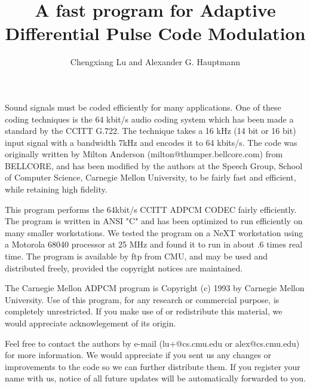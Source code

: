 \setlength{\parskip}{2ex}\setlength{\parindent}{0pt}
\renewcommand{\topfraction}{0.95}
\renewcommand{\textfraction}{0.05}
\setcounter{topnumber}{2}\setcounter{bottomnumber}{2}

\title{A fast program for Adaptive Differential Pulse Code Modulation}
\author{Chengxiang Lu and Alexander G. Hauptmann}


\maketitle


Sound signals must be coded efficiently for many applications. 
One of these coding techniques is the 64 kbit/s audio coding system
which has been made a standard by the CCITT G.722.
The technique takes a 16 kHz (14 bit or 16 bit) input signal with a bandwidth
7kHz and encodes it to 64 kbits/s. 
The code was originally written by Milton Anderson (milton@thumper.bellcore.com)
 from BELLCORE, and has
been modified by the authors at the Speech Group, School of Computer Science, 
Carnegie Mellon University, to be fairly fast and efficient, 
while retaining high fidelity.

This program performs the 64kbit/s CCITT ADPCM CODEC fairly efficiently.
The program is written in ANSI "C" and has been optimized to run efficiently 
on many smaller workstations. We tested the program on a NeXT
workstation using a Motorola 68040 processor at 25 MHz and found it
to run in about .6 times real time.
The program is available by ftp from CMU, and may be used and distributed
freely, provided the copyright notices are maintained.

The Carnegie Mellon ADPCM program is Copyright (c) 1993
by Carnegie Mellon University. Use of this program, for any research or
commercial purpose, is completely unrestricted.  If you make use of or
redistribute this material, we would appreciate acknowlegement of its origin.

Feel free to 
contact the authors by e-mail (lu+@cs.cmu.edu or alex@cs.cmu.edu) 
for more information.
We would appreciate if you sent us any changes or improvements to the code
so we can further distribute them. If you register your name with us,
notice of all future updates will be automatically forwarded to you.

